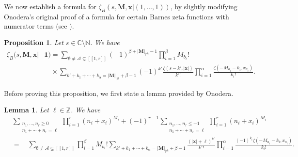 \documentclass[a4paper]{amsart}
\newtheorem{proposition}[theorem]{Proposition}
\newtheorem{lemma}[theorem]{Lemma}
\theoremstyle{remark}
\theoremstyle{definition}
\begin{document}
We now establish a formula for $\zeta_B(s,\mathbf{M},\mathbf{x}|(1,\ldots,1))$, by slightly modifying Onodera's original proof of a formula for certain Barnes zeta functions with numerator terms (see \cite[Proposition 4.1]{onodera2021multiple}).

\begin{proposition}
\label{prop:formula_generalized_barnes_x1}
Let $s \in \mathbb{C} \setminus \mathbb{N}$. We have
\begin{align}
    \zeta_B(s,\mathbf{M},\mathbf{x}|&\mathbf{1}) = \sum_{\emptyset \neq \mathcal{A} \subsetneq [\![1,r]\!]} (-1)^{\beta+|\mathbf{M}|_{|\mathcal{B}}-1} \prod_{i=1}^{\beta} M_{b_i}!  \label{eq:formula_zeta_barnes_1} \\
    & \quad \times \sum_{k'+k_1+\cdots+k_{\alpha} = |\mathbf{M}|_{|\mathcal{B}}+\beta-1} (-1)^{k'} \frac{\zeta(s-k',|\mathbf{x}|)}{k'!} \prod_{i=1}^{\alpha} \frac{\zeta(-M_{a_i}-k_i,x_{a_i})}{k_i!}. \nonumber
\end{align}
\end{proposition}

Before proving this proposition, we first state a lemma provided by Onodera.

\begin{lemma}
\cite[Lemma 4.2]{onodera2021multiple}
\label{lem:generalized_faulhaber}
Let $\ell \in \mathbb{Z}$. We have
\begin{align*}
    & \sum_{\substack{n_1,\ldots,n_r \geq 0 \\ n_1+\cdots+n_r=\ell}} \prod_{i=1}^r (n_i+x_i)^{M_i} + (-1)^{r-1} \sum_{\substack{n_1,\ldots,n_r \leq -1 \\ n_1+\cdots+n_{r}=\ell}} \prod_{i=1}^r (n_i+x_i)^{M_i} \\
    & = \quad \sum_{\emptyset \neq \mathcal{A} \subsetneq [\![ 1,r]\!]} \prod_{i=1}^{\beta} M_{b_i}! \sum_{k'+k_1+\cdots+k_{\alpha}=|\mathbf{M}|_{|\mathcal{B}}+\beta-1} \frac{(|\mathbf{x}|+\ell)^{k'}}{k'!} \prod_{i=1}^{\alpha} \frac{(-1)^{k_i}\zeta(-M_{a_i}-k_i,x_{a_i})}{k_i!}.
\end{align*}
\end{lemma}
\end{document}
